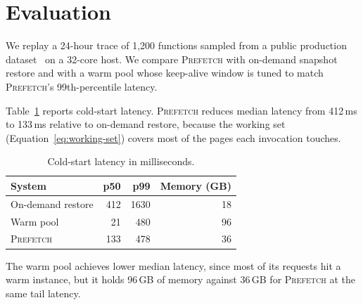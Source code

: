 \section{Evaluation}
\label{sec:results}

We replay a 24-hour trace of 1{,}200 functions sampled from a public production
dataset~\cite{shahrad2020serverless} on a 32-core host. We compare
\textsc{Prefetch} with on-demand snapshot restore and with a warm pool whose
keep-alive window is tuned to match \textsc{Prefetch}'s 99th-percentile latency.

Table~\ref{tab:latency} reports cold-start latency. \textsc{Prefetch} reduces
median latency from 412\,ms to 133\,ms relative to on-demand restore, because
the working set (Equation~\ref{eq:working-set}) covers most of the pages each
invocation touches. 

\begin{table}[t]
  \centering
  \caption{Cold-start latency in milliseconds.}
  \label{tab:latency}
  \begin{tabular}{lrrr}
    \toprule
    System & p50 & p99 & Memory (GB) \\
    \midrule
    On-demand restore & 412 & 1630 & 18 \\
    Warm pool         &  21 &  480 & 96 \\
    \textsc{Prefetch} & 133 &  478 & 36 \\
    \bottomrule
  \end{tabular}
\end{table}

The warm pool achieves lower median latency, since most of its requests hit a
warm instance, but it holds 96\,GB of memory against 36\,GB for
\textsc{Prefetch} at the same tail latency.
